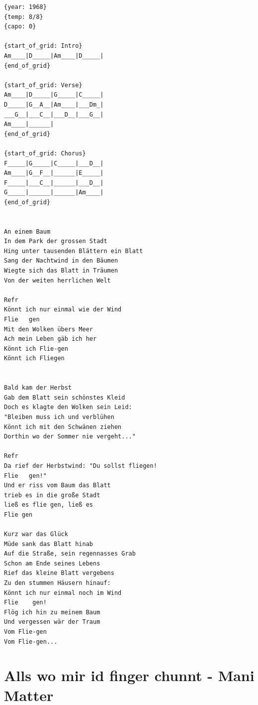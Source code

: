 \documentclass[]{book}
\let\stdsection\section
\renewcommand\section{\clearpage\stdsection}
\begin{document}
\begin{verbatim}
{year: 1968}
{temp: 8/8}
{capo: 0}

{start_of_grid: Intro}
Am____|D_____|Am____|D_____|
{end_of_grid}

{start_of_grid: Verse}
Am____|D_____|G_____|C_____|
D_____|G__A__|Am____|___Dm_|
___G__|___C__|___D__|___G__|
Am____|______|
{end_of_grid}

{start_of_grid: Chorus}
F_____|G_____|C_____|___D__|
Am____|G__F__|______|E_____|
F_____|___C__|______|___D__|
G_____|______|______|Am____|
{end_of_grid}


An einem Baum
In dem Park der grossen Stadt
Hing unter tausenden Blättern ein Blatt
Sang der Nachtwind in den Bäumen
Wiegte sich das Blatt in Träumen
Von der weiten herrlichen Welt

Refr
Könnt ich nur einmal wie der Wind
Flie   gen
Mit den Wolken übers Meer
Ach mein Leben gäb ich her
Könnt ich Flie-gen
Könnt ich Fliegen


Bald kam der Herbst
Gab dem Blatt sein schönstes Kleid
Doch es klagte den Wolken sein Leid:
"Bleiben muss ich und verblühen
Könnt ich mit den Schwänen ziehen
Dorthin wo der Sommer nie vergeht..."

Refr
Da rief der Herbstwind: "Du sollst fliegen! 
Flie   gen!"
Und er riss vom Baum das Blatt
trieb es in die große Stadt
ließ es flie gen, ließ es
Flie gen
 
Kurz war das Glück
Müde sank das Blatt hinab
Auf die Straße, sein regennasses Grab
Schon am Ende seines Lebens
Rief das kleine Blatt vergebens
Zu den stummen Häusern hinauf:
Könnt ich nur einmal noch im Wind
Flie    gen!
Flög ich hin zu meinem Baum
Und vergessen wär der Traum
Vom Flie-gen
Vom Flie-gen...
\end{verbatim}

\hypertarget{alls-wo-mir-id-finger-chunnt---mani-matter}{%
\section{Alls wo mir id finger chunnt - Mani Matter}\label{alls-wo-mir-id-finger-chunnt---mani-matter}}
\end{document}
